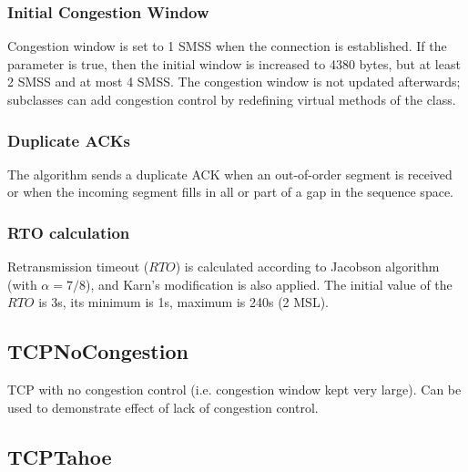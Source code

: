 \subsubsection*{Initial Congestion Window}

Congestion window is set to 1 SMSS when the connection is established.
If the  parameter is true, then the initial
window is increased to 4380 bytes, but at least 2 SMSS and at most 4 SMSS.
The congestion window is not updated afterwards; subclasses can
add congestion control by redefining virtual methods of the
 class.

\subsubsection*{Duplicate ACKs}

The algorithm sends a duplicate ACK when an out-of-order
segment is received or when the incoming segment fills in all
or part of a gap in the sequence space.

\subsubsection*{RTO calculation}

Retransmission timeout ($RTO$) is calculated according to
Jacobson algorithm (with $\alpha=7/8$), and Karn's modification is also applied.
The initial value of the $RTO$ is 3s, its minimum is 1s,
maximum is 240s (2 MSL).


\subsection{TCPNoCongestion}

TCP with no congestion control (i.e. congestion window kept very large).
Can be used to demonstrate effect of lack of congestion control.


\subsection{TCPTahoe}

